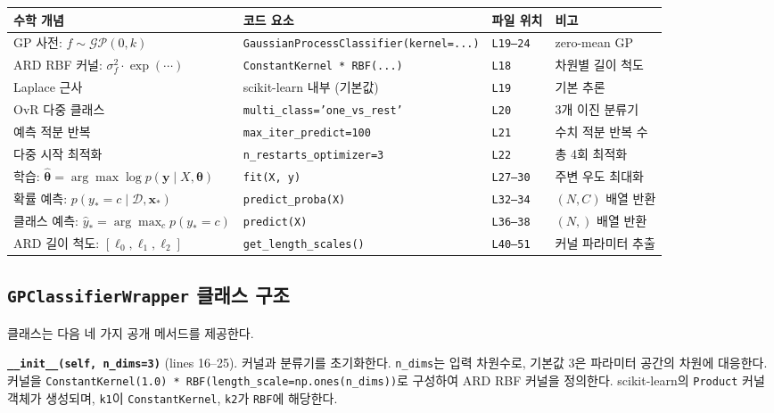 \documentclass[11pt]{article}
\begin{document}
\begin{table}[h]
\centering
\small
\begin{tabular}{llll}
\toprule
수학 개념 & 코드 요소 & 파일 위치 & 비고 \\
\midrule
GP 사전: $f \sim \mathcal{GP}(0, k)$ &
  \texttt{GaussianProcessClassifier(kernel=...)} &
  \texttt{L19--24} & zero-mean GP \\
ARD RBF 커널: $\sigma_f^2 \cdot \exp(\cdots)$ &
  \texttt{ConstantKernel * RBF(...)} &
  \texttt{L18} & 차원별 길이 척도 \\
Laplace 근사 &
  scikit-learn 내부 (기본값) &
  \texttt{L19} & 기본 추론 \\
OvR 다중 클래스 &
  \texttt{multi\_class='one\_vs\_rest'} &
  \texttt{L20} & 3개 이진 분류기 \\
예측 적분 반복 &
  \texttt{max\_iter\_predict=100} &
  \texttt{L21} & 수치 적분 반복 수 \\
다중 시작 최적화 &
  \texttt{n\_restarts\_optimizer=3} &
  \texttt{L22} & 총 4회 최적화 \\
학습: $\hat{\boldsymbol{\theta}} = \arg\max \log p(\mathbf{y} \mid X, \boldsymbol{\theta})$ &
  \texttt{fit(X, y)} &
  \texttt{L27--30} & 주변 우도 최대화 \\
확률 예측: $p(y_* = c \mid \mathcal{D}, \mathbf{x}_*)$ &
  \texttt{predict\_proba(X)} &
  \texttt{L32--34} & $(N, C)$ 배열 반환 \\
클래스 예측: $\hat{y}_* = \arg\max_c p(y_* = c)$ &
  \texttt{predict(X)} &
  \texttt{L36--38} & $(N,)$ 배열 반환 \\
ARD 길이 척도: $[\ell_0, \ell_1, \ell_2]$ &
  \texttt{get\_length\_scales()} &
  \texttt{L40--51} & 커널 파라미터 추출 \\
\bottomrule
\end{tabular}
\end{table}


\subsection{\texttt{GPClassifierWrapper} 클래스 구조}

클래스는 다음 네 가지 공개 메서드를 제공한다.

\textbf{\texttt{\_\_init\_\_(self, n\_dims=3)}} (lines 16--25).
커널과 분류기를 초기화한다. \texttt{n\_dims}는 입력 차원수로, 기본값 3은 파라미터 공간의 차원에 대응한다.
커널을 \texttt{ConstantKernel(1.0) * RBF(length\_scale=np.ones(n\_dims))}로 구성하여 ARD RBF 커널을 정의한다.
scikit-learn의 \texttt{Product} 커널 객체가 생성되며, \texttt{k1}이 \texttt{ConstantKernel}, \texttt{k2}가 \texttt{RBF}에 해당한다.
\end{document}
